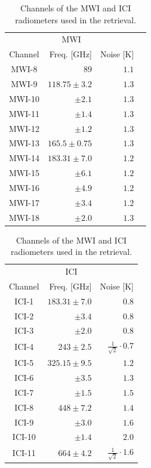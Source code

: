 \documentclass[journal abbreviation, manuscript]{copernicus}
\begin{document}
\begin{table}[hbpt]
\caption{Channels of the MWI and ICI radiometers used in the retrieval.}
\label{tab:channels}
    \begin{tabular}{c|r|r|p{2cm}}
    \multicolumn{3}{c}{MWI}\\
    Channel & Freq. [GHz] & Noise [K] \\
    \hline
    MWI-8  & $89$              & $1.1$ \\
    MWI-9  & $118.75 \pm 3.2$  & $1.3$ \\
    MWI-10 & $\pm 2.1$         & $1.3$ \\
    MWI-11 & $\pm 1.4$         & $1.3$ \\
    MWI-12 & $\pm 1.2$         & $1.3$ \\
    MWI-13 & $165.5 \pm 0.75$  & $1.3$ \\
    MWI-14 & $183.31 \pm 7.0$  & $1.2$ \\
    MWI-15 & $ \pm 6.1$        & $1.2$ \\
    MWI-16 & $ \pm 4.9$        & $1.2$ \\
    MWI-17 & $ \pm 3.4$        & $1.2$ \\
    MWI-18 & $ \pm 2.0$        & $1.3$ \\
    \end{tabular}%
    \hspace{1cm}%
    \begin{tabular}{c|r|r}
    \multicolumn{3}{c}{ICI}\\
    Channel & Freq. [GHz] & Noise [K]  \\
    \hline
    ICI-1  & $183.31 \pm 7.0$ & $0.8$ \\
    ICI-2  & $       \pm 3.4$ & $0.8$ \\
    ICI-3  & $       \pm 2.0$ & $0.8$ \\
    ICI-4  & $243    \pm 2.5$ & $\frac{1}{\sqrt{2}} \cdot 0.7$ \\
    ICI-5  & $325.15 \pm 9.5$ & $1.2$ \\
    ICI-6  & $       \pm 3.5$ & $1.3$ \\
    ICI-7  & $       \pm 1.5$ & $1.5$ \\
    ICI-8  & $448    \pm 7.2$ & $1.4$ \\
    ICI-9  & $       \pm 3.0$ & $1.6$ \\
    ICI-10 & $       \pm 1.4$ & $2.0$ \\
    ICI-11 & $664    \pm 4.2$ & $\frac{1}{\sqrt{2}} \cdot 1.6$ \\
    \end{tabular}
\end{table}
\end{document}
